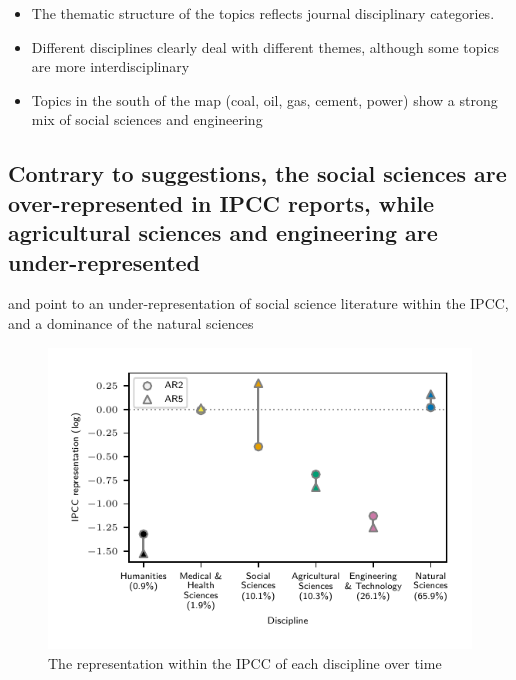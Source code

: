\documentclass{article}
\begin{document}
\begin{itemize}
	\item The thematic structure of the topics reflects journal disciplinary categories. 
	\item Different disciplines clearly deal with different themes, although some topics are more interdisciplinary 
	\item Topics in the south of the map (coal, oil, gas, cement, power) show a strong mix of social sciences and engineering
\end{itemize}

\bigskip

\subsection{Contrary to suggestions, the social sciences are over-represented in IPCC reports, while agricultural sciences and engineering are under-represented}


\citep{Bjurström2011} and \citep{Victor2015} point to an under-representation of social science literature within the IPCC, and a dominance of the natural sciences


\begin{figure}[h!]
	\begin{center}
		\includegraphics[width=0.85\linewidth]{plots/ipcc_representation/ipcc_rep_oecds_simplified.pdf}
		\caption{The representation within the IPCC of each discipline over time}
		\label{oecd_rep}
	\end{center}
\end{figure}
\end{document}
